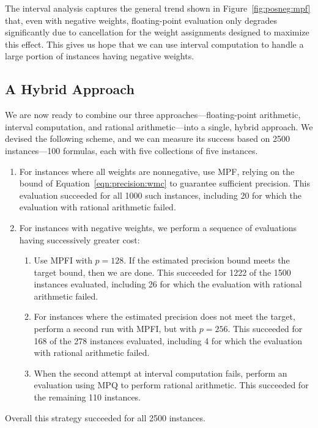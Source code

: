 \documentclass[letterpaper,USenglish,cleveref, autoref, thm-restate]{lipics-v2021}
\begin{document}
The interval analysis captures the general trend shown in
Figure~\ref{fig:posneg:mpf} that, even with negative
weights, floating-point evaluation only degrades significantly due to cancellation
for the weight assignments designed to maximize
this effect.  This gives us hope that we can use interval computation
to handle a large portion of instances having negative weights.

\subsection{A Hybrid Approach}
\label{sect:hybrid}

We are now ready to combine our three approaches---floating-point
arithmetic, interval computation, and rational arithmetic---into a
single, hybrid approach.  We devised the following scheme, and we can
measure its success based on 2500 instances---100 formulas, each with five collections of five instances.
\begin{enumerate}
\item For instances where all weights are nonnegative, use MPF,
  relying on the bound of Equation~\ref{eqn:precision:wmc} to
  guarantee sufficient precision.  This evaluation succeeded for all 1000 such
  instances, including 20 for which the evaluation with rational arithmetic failed.
\item For instances with negative weights, we perform a sequence of evaluations having successively greater cost:
\begin{enumerate}
\item 
  Use MPFI with $p=128$.  If the estimated precision
  bound meets the target bound, then we are done.  This succeeded for
  1222 of the 1500 instances evaluated, including 26 for which the evaluation with rational arithmetic failed.
\item For instances where the estimated precision does not meet the target, perform a second run with MPFI, but with $p=256$.  This succeeded
  for 168 of the 278 instances evaluated, including 4 for which the evaluation with rational arithmetic failed.
\item When the second attempt at interval computation fails, perform
  an evaluation using MPQ to perform rational arithmetic.  This
  succeeded for the remaining 110 instances.
\end{enumerate}
\end{enumerate}
Overall this strategy succeeded for all 2500 instances.
\end{document}
